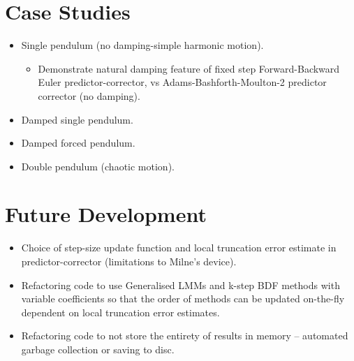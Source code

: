 \documentclass[11pt,a4paper]{article}
\begin{document}
\section{Case Studies}

\begin{itemize}
  \item Single pendulum (no damping-simple harmonic motion).
    \begin{itemize}[label=$\star$]
      \item Demonstrate natural damping feature of fixed step Forward-Backward Euler predictor-corrector, vs Adams-Bashforth-Moulton-2 predictor corrector (no damping).
    \end{itemize}
  \item Damped single pendulum.
  \item Damped forced pendulum.
  \item Double pendulum (chaotic motion).
\end{itemize} 


\section{Future Development}

\begin{itemize}
  \item Choice of step-size update function and local truncation error estimate in predictor-corrector (limitations to Milne’s device).
  \item Refactoring code to use Generalised LMMs and k-step BDF methods with variable coefficients so that the order of methods can be updated on-the-fly dependent on local truncation error estimates.
  \item Refactoring code to not store the entirety of results in memory – automated garbage collection or saving to disc. 
\end{itemize}
\end{document}
